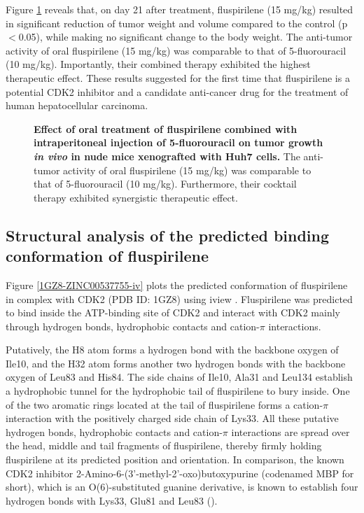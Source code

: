 \documentclass[10pt,letterpaper]{article}
\begin{document}
Figure \ref{FluspirileneFluorouracilOnTumorGrowth} reveals that, on day 21 after treatment, fluspirilene (15 mg/kg) resulted in significant reduction of tumor weight and volume compared to the control (p$<$0.05), while making no significant change to the body weight. The anti-tumor activity of oral fluspirilene (15 mg/kg) was comparable to that of 5-fluorouracil (10 mg/kg). Importantly, their combined therapy exhibited the highest therapeutic effect. These results suggested for the first time that fluspirilene is a potential CDK2 inhibitor and a candidate anti-cancer drug for the treatment of human hepatocellular carcinoma.

\begin{figure}%
\caption{{\bf Effect of oral treatment of fluspirilene combined with intraperitoneal injection of 5-fluorouracil on tumor growth \textit{in vivo} in nude mice xenografted with Huh7 cells.} The anti-tumor activity of oral fluspirilene (15 mg/kg) was comparable to that of 5-fluorouracil (10 mg/kg). Furthermore, their cocktail therapy exhibited synergistic therapeutic effect.}
\label{FluspirileneFluorouracilOnTumorGrowth}
\end{figure}

\subsection*{Structural analysis of the predicted binding conformation of fluspirilene}

Figure \ref{1GZ8-ZINC00537755-iv} plots the predicted conformation of fluspirilene in complex with CDK2 (PDB ID: 1GZ8) using iview \cite{1366}. Fluspirilene was predicted to bind inside the ATP-binding site of CDK2 and interact with CDK2 mainly through hydrogen bonds, hydrophobic contacts and cation-$\pi$ interactions. 

Putatively, the H8 atom forms a hydrogen bond with the backbone oxygen of Ile10, and the H32 atom forms another two hydrogen bonds with the backbone oxygen of Leu83 and His84. The side chains of Ile10, Ala31 and Leu134 establish a hydrophobic tunnel for the hydrophobic tail of fluspirilene to bury inside. One of the two aromatic rings located at the tail of fluspirilene forms a cation-$\pi$ interaction with the positively charged side chain of Lys33. All these putative hydrogen bonds, hydrophobic contacts and cation-$\pi$ interactions are spread over the head, middle and tail fragments of fluspirilene, thereby firmly holding fluspirilene at its predicted position and orientation. In comparison, the known CDK2 inhibitor 2-Amino-6-(3'-methyl-2'-oxo)butoxypurine (codenamed MBP for short), which is an O(6)-substituted guanine derivative, is known to establish four hydrogen bonds with Lys33, Glu81 and Leu83 ().
\end{document}
